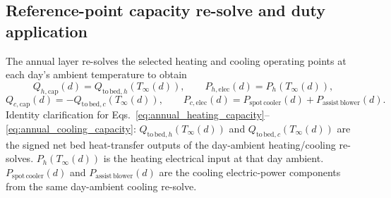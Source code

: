 \documentclass[11pt]{article}
\begin{document}
\subsection{Reference-point capacity re-solve and duty application}
The annual layer re-solves the selected heating and cooling operating points at each day’s ambient temperature to obtain
\begin{equation}
\label{eq:annual_heating_capacity}
Q_{h,\mathrm{cap}}(d)=Q_{\mathrm{to\,bed},h}\!\left(T_\infty(d)\right),
\qquad
P_{h,\mathrm{elec}}(d)=P_h\!\left(T_\infty(d)\right),
\end{equation}
\begin{equation}
\label{eq:annual_cooling_capacity}
Q_{c,\mathrm{cap}}(d)=-Q_{\mathrm{to\,bed},c}\!\left(T_\infty(d)\right),
\qquad
P_{c,\mathrm{elec}}(d)=P_{\mathrm{spot\,cooler}}(d)+P_{\mathrm{assist\,blower}}(d).
\end{equation}
Identity clarification for Eqs.~\eqref{eq:annual_heating_capacity}--\eqref{eq:annual_cooling_capacity}: \(Q_{\mathrm{to\,bed},h}(T_\infty(d))\) and \(Q_{\mathrm{to\,bed},c}(T_\infty(d))\) are the signed net bed heat-transfer outputs of the day-ambient heating/cooling re-solves. \(P_h(T_\infty(d))\) is the heating electrical input at that day ambient. \(P_{\mathrm{spot\,cooler}}(d)\) and \(P_{\mathrm{assist\,blower}}(d)\) are the cooling electric-power components from the same day-ambient cooling re-solve.
\end{document}
